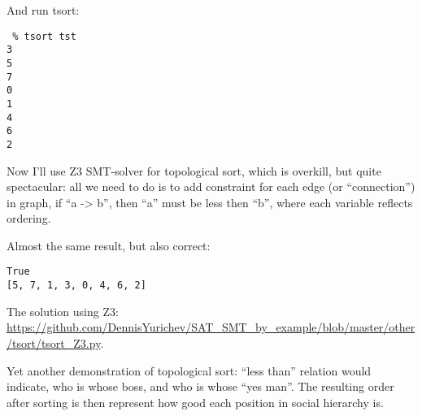 And run tsort:

\begin{lstlisting}
 % tsort tst
3
5
7
0
1
4
6
2
\end{lstlisting}

Now I'll use Z3 SMT-solver for topological sort, which is overkill, but quite spectacular: all we need to do
is to add constraint for each edge (or ``connection'') in graph, if ``a -> b'', then ``a'' must be less then ``b'', where
each variable reflects ordering.



Almost the same result, but also correct:

\begin{lstlisting}
True
[5, 7, 1, 3, 0, 4, 6, 2]
\end{lstlisting}

The solution using Z3: \url{https://github.com/DennisYurichev/SAT_SMT_by_example/blob/master/other/tsort/tsort_Z3.py}.

Yet another demonstration of topological sort: ``less than'' relation would indicate, 
who is whose boss, and who is whose ``yes man''.
The resulting order after sorting is then represent how good each position in social hierarchy is.

